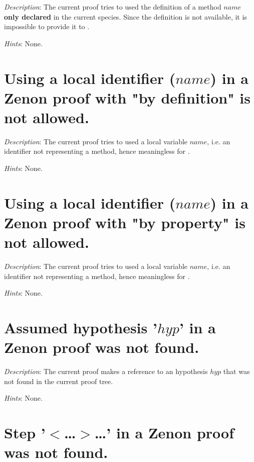 {\em Description}: The current proof tries to used the definition of a
method $name$ {\bf only declared} in the current species. Since the
definition is not available, it is impossible to provide it to
{\zenon}.

{\em Hints}: None.



\section*{Using a local identifier ($name$) in a Zenon proof with "by
  definition" is not allowed.}

{\em Description}: The current proof tries to used a local variable
$name$, i.e. an identifier not representing a method, hence
meaningless for {\zenon}.

{\em Hints}: None.



\section*{Using a local identifier ($name$) in a Zenon proof with "by
  property" is not allowed.}

{\em Description}: The current proof tries to used a local variable
$name$, i.e. an identifier not representing a method, hence
meaningless for {\zenon}.

{\em Hints}: None.



\section*{Assumed hypothesis '$hyp$' in a Zenon proof was not found.}

{\em Description}: The current proof makes a reference to an
hypothesis $hyp$ that was not found in the current proof tree.

{\em Hints}: None.



\section*{Step '$<$\ldots$>$\ldots' in a Zenon proof was not found.}

